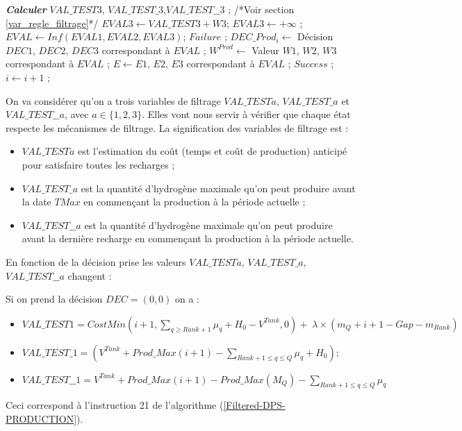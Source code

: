 \begin{algorithm}
\begin{algorithmic}[1]
		\STATE \textit{\textbf{Calculer}} $VAL\_TEST3$, $VAL\_TEST\_3$,$VAL\_TEST\_\_3$ ; /*Voir section \ref{var_regle_filtrage}*/
		\STATE  $EVAL3 \leftarrow VAL\_TEST3 + W3$;
		\ELSE
		\STATE $EVAL3 \leftarrow + \infty$ ;
		\ENDIF
		\STATE $EVAL \leftarrow Inf (EVAL1, EVAL2, EVAL3)$;
		\STATE $Failure$ ;
		\ELSE
		\STATE $DEC\_Prod_i \leftarrow$ Décision $DEC1$, $DEC2$, $DEC3$ correspondant à $EVAL$ ; 
		\STATE $W^{Prod} \leftarrow$ Valeur $W1$, $W2$, $W3$ correspondant à $EVAL$ ; 
		\STATE $E \leftarrow E1$, $E2$, $E3$ correspondant à $EVAL $ ; 
		\STATE $Success$ ;
		\ENDIF
		\ENDIF
		\STATE $i \leftarrow i+1$ ;
		\ENDWHILE
	\end{algorithmic}
\end{algorithm}


On va considérer qu'on a trois variables de filtrage $VAL\_TESTa$, $VAL\_TEST\_a$ et $VAL\_TEST\_\_a$, avec $a \in \{1,2,3\}$. Elles vont nous servir à vérifier que chaque état respecte les mécanismes de filtrage. La signification des variables de filtrage est :
\begin{itemize}[label=$\square$]
	\item $VAL\_TESTa$ est l'estimation du coût (temps et coût de production) anticipé pour satisfaire toutes les recharges ; 
	
	\item $VAL\_TEST\_a$ est la quantité d'hydrogène maximale qu'on peut produire avant la date $TMax$ en commençant la production à la période actuelle ;
	\item $VAL\_TEST\_\_a$ est la quantité d'hydrogène maximale qu'on peut produire avant la dernière recharge en commençant la production à la période actuelle.
\end{itemize}	
\label{var_regle_filtrage}
En fonction de la décision prise les valeurs $VAL\_TESTa$, $VAL\_TEST\_a$, $VAL\_TEST\_\_a$ changent :

Si on prend la décision $DEC=(0,0)$ on a :
\begin{itemize}[label=$\square$]
	\item $VAL\_TEST1= CostMin(i+1, \sum_{q \geq Rank+1} \mu_q + H_0 - V^{Tank}, 0) + \lambda \times (m_Q + i + 1 - Gap - m_{Rank} )$
	\item $VAL\_TEST\_1=(V^{Tank} + Prod\_Max(i+1)  - \sum_{ Rank+1 \leq q \leq Q} \mu_q+ H_0);$
	\item $VAL\_TEST\_\_1=V^{Tank} + Prod\_Max(i+1) - Prod\_Max(M_Q) - \sum_{ Rank+1 \leq q \leq Q} \mu_q$ 
\end{itemize}
Ceci correspond à l'instruction 21 de l'algorithme (\ref{Filtered-DPS-PRODUCTION}).

